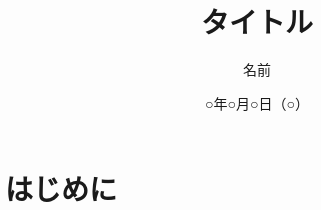 \documentclass{jsarticle}
\title{タイトル}
\author{名前} %
\date{○年○月○日（○）} %
\begin{document}
\maketitle

\tableofcontents

\section{はじめに}
\end{document}
